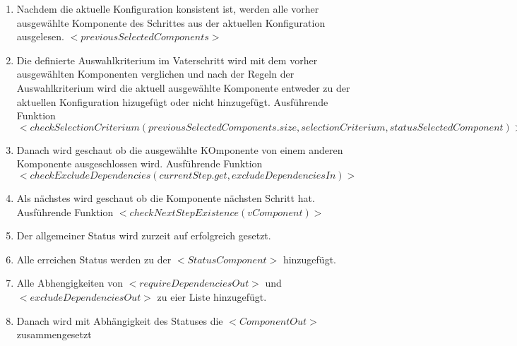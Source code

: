 \documentclass{article}
\begin{document}
\begin{enumerate}
    \item Nachdem die aktuelle Konfiguration konsistent ist, werden
    alle vorher ausgew\"ahlte Komponente des Schrittes aus der
    aktuellen Konfiguration ausgelesen. $<previousSelectedComponents>$
    
    \item Die definierte Auswahlkriterium im Vaterschritt wird mit dem vorher
    ausgew\"ahlten Komponenten verglichen und nach der Regeln der
    Auswahlkriterium wird die aktuell ausgew\"ahlte Komponente entweder zu der
    aktuellen Konfiguration hizugef\"ugt oder nicht hinzugef\"ugt.
    Ausf\"uhrende Funktion $<checkSelectionCriterium(previousSelectedComponents.size, selectionCriterium, statusSelectedComponent)>$
    
    \item Danach wird geschaut ob die ausgew\"ahlte KOmponente von einem anderen
    Komponente ausgeschlossen wird.
    Ausf\"uhrende Funktion $<checkExcludeDependencies(currentStep.get, excludeDependenciesIn)>$
    
    \item Als nächstes wird geschaut ob die Komponente n\"achsten Schritt hat.
    Ausf\"uhrende Funktion $<checkNextStepExistence(vComponent)>$
    
    \item Der allgemeiner Status wird zurzeit auf erfolgreich gesetzt.
    
    \item Alle erreichen Status werden zu der $<StatusComponent>$ hinzugef\"ugt.
    
    \item Alle Abhengigkeiten von $<requireDependenciesOut>$ und
    $<excludeDependenciesOut>$ zu eier Liste hinzugef\"ugt.
    
    \item Danach wird mit Abh\"angigkeit des Statuses die $<ComponentOut>$
    zusammengesetzt
    
\end{enumerate}
\end{document}
